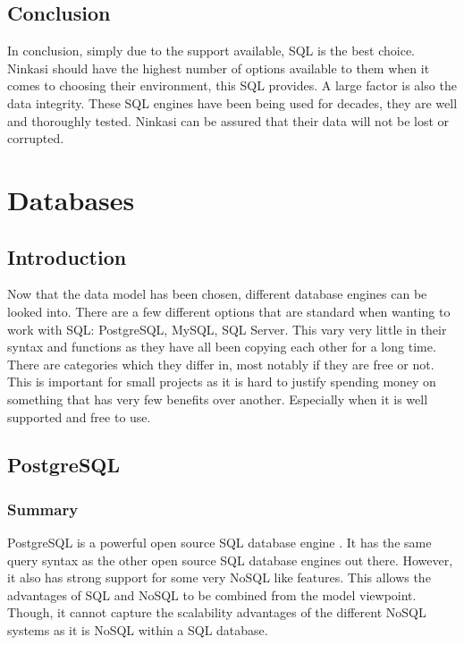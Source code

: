     \subsection{Conclusion}

    In conclusion, simply due to the support available, SQL is the best choice.  Ninkasi should have the highest number of options available to them when it comes to choosing their environment, this SQL provides.  A large factor is also the data integrity.  These SQL engines have been being used for decades, they are well and thoroughly tested.  Ninkasi can be assured that their data will not be lost or corrupted.

\section{Databases}

    \subsection{Introduction}
    
    Now that the data model has been chosen, different database engines can be looked into.  There are a few different options that are standard when wanting to work with SQL: PostgreSQL, MySQL, SQL Server.  This vary very little in their syntax and functions as they have all been copying each other for a long time.  There are categories which they differ in, most notably if they are free or not.  This is important for small projects as it is hard to justify spending money on something that has very few benefits over another.  Especially when it is well supported and free to use.
    
    \subsection{PostgreSQL}
    
        \subsubsection{Summary}
        
        PostgreSQL is a powerful open source SQL database engine \cite{postgresql}.  It has the same query syntax as the other open source SQL database engines out there.  However, it also has strong support for some very NoSQL like features.  This allows the advantages of SQL and NoSQL to be combined from the model viewpoint.  Though, it cannot capture the scalability advantages of the different NoSQL systems as it is NoSQL within a SQL database.
        
